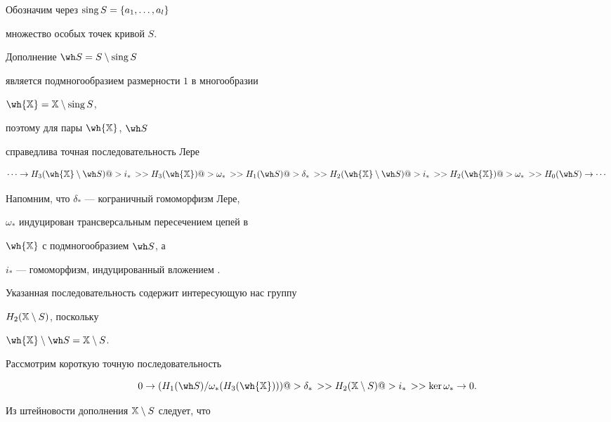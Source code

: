 \begin{pf}


Обозначим через $\operatorname{sing} S=\{a_1,\dotsc,a_l\}$


множество особых точек кривой $S$.


Дополнение $\wh S= S\setminus \sing S$


является подмногообразием размерности $1$ в многообразии


$\wh{\Bbb X}=\Bbb X\setminus \sing S$,


поэтому для пары $\wh{\Bbb X}$, $\wh S$


справедлива точная последовательность Лере


$$


\dotsb\rightarrow


H_3( \wh{\Bbb X}\setminus \wh S )\li


H_3(\wh{\Bbb X} )\lo


H_1 (\wh S )\ld


H_2 (\wh{\Bbb X}\setminus \wh S )\li


H_2 (\wh{\Bbb X} )\lo


H_0( \wh S )


\rightarrow\dotsb


$$


Напомним, что $\delta_*$ --- кограничный гомоморфизм Лере,


$\omega_*$ индуцирован трансверсальным пересечением цепей в


$\wh{\Bbb X}$ с подмногообразием $\wh S$, а


$i_*$ --- гомоморфизм, индуцированный вложением \cite{L}.


Указанная последовательность содержит интересующую нас группу


$H_2(\Bbb X\setminus S)$, поскольку


$\wh{\Bbb X}\setminus \wh S=\Bbb X\setminus S$.





Рассмотрим короткую точную последовательность


$$


0\rightarrow


( H_1 (\wh S ) / \omega_* (H_3(\wh{\Bbb X}))) \ld


H_2 (\Bbb X\setminus S )\li


\ker \omega_*\rightarrow 0.


$$


Из штейновости дополнения $\Bbb X\setminus S$ следует, что



\end{pf}

